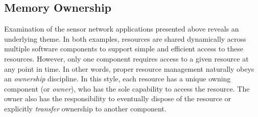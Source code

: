 





\subsection{Memory Ownership}
\label{subsec:owner}

Examination of the sensor network applications 
presented above reveals an underlying
theme.  In both examples, resources are shared dynamically across multiple
software components to support simple and efficient access to these
resources.  However, only one component requires access to a given
resource at any point in time.  
In other words, proper resource management
naturally obeys an {\em ownership} discipline.  In this
style, each resource has a unique owning component (or {\em owner}), 
who has the sole
capability to access the resource.  The owner also has the responsibility to
eventually dispose of the resource or explicitly {\em transfer} 
ownership to another
component.

